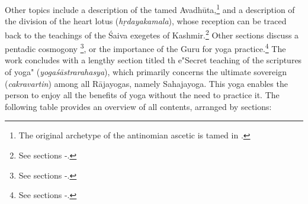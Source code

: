 Other topics include a description of the tamed Avadhūta,\footnote{The original archetype of the antinomian ascetic is tamed in .} and a description of the division of the heart lotus (\textit{hṛdayakamala}), whose reception can be traced back to the teachings of the Śaiva exegetes of Kashmir.\footnote{See sections -.} Other sections discuss a pentadic cosmogony \footnote{See sections -.}, or the importance of the Guru for yoga practice.\footnote{See sections -.} The work concludes with a lengthy section titled th e"Secret teaching of the scriptures of yoga" (\textit{yogaśāstrarahasya}), which primarily concerns the ultimate sovereign (\textit{cakravartin}) among all Rājayogas, namely Sahajayoga. This yoga enables the person to enjoy all the benefits of yoga without the need to practice it. The following table provides an overview of all contents, arranged by sections:

